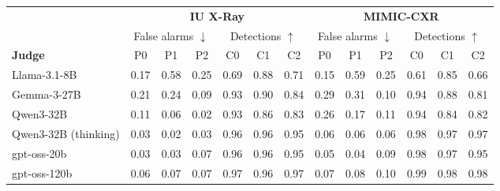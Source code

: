 \begin{tabular}{lcccccccccccc}
\toprule
 & \multicolumn{6}{c}{\textbf{IU X-Ray}} & \multicolumn{6}{c}{\textbf{MIMIC-CXR}} \\
\cmidrule(lr){2-7}\cmidrule(lr){8-13}
 & \multicolumn{3}{c}{False alarms $\downarrow$} & \multicolumn{3}{c}{Detections $\uparrow$} & \multicolumn{3}{c}{False alarms $\downarrow$} & \multicolumn{3}{c}{Detections $\uparrow$} \\
\cmidrule(lr){2-4}\cmidrule(lr){5-7}\cmidrule(lr){8-10}\cmidrule(lr){11-13}
\textbf{Judge} & P0 & P1 & P2 & C0 & C1 & C2 & P0 & P1 & P2 & C0 & C1 & C2 \\
\midrule
Llama-3.1-8B & 0.17 & 0.58 & 0.25 & 0.69 & 0.88 & 0.71 & 0.15 & 0.59 & 0.25 & 0.61 & 0.85 & 0.66 \\
Gemma-3-27B & 0.21 & 0.24 & 0.09 & 0.93 & 0.90 & 0.84 & 0.29 & 0.31 & 0.10 & 0.94 & 0.88 & 0.81 \\
Qwen3-32B & 0.11 & 0.06 & 0.02 & 0.93 & 0.86 & 0.83 & 0.26 & 0.17 & 0.11 & 0.94 & 0.84 & 0.82 \\
Qwen3-32B (thinking) & 0.03 & 0.02 & 0.03 & 0.96 & 0.96 & 0.95 & 0.06 & 0.06 & 0.06 & 0.98 & 0.97 & 0.97 \\
gpt-oss-20b & 0.03 & 0.03 & 0.07 & 0.96 & 0.96 & 0.95 & 0.05 & 0.04 & 0.09 & 0.98 & 0.97 & 0.95 \\
gpt-oss-120b & 0.06 & 0.07 & 0.07 & 0.97 & 0.96 & 0.97 & 0.07 & 0.08 & 0.10 & 0.99 & 0.98 & 0.98 \\
\bottomrule
\end{tabular}
